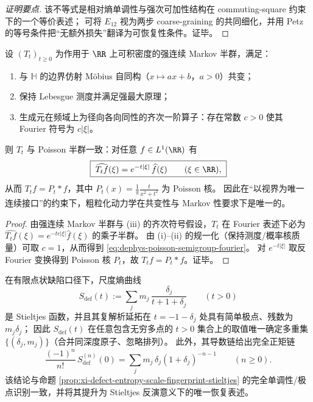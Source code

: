 \begin{proof}[证明要点]
该不等式是相对熵单调性与强次可加性结构在 commuting-square 约束下的一个等价表述；
可将 \(E_{12}\) 视为两步 coarse-graining 的共同细化，并用 Petz 的等号条件把“无额外损失”翻译为可恢复性条件。证毕。
\end{proof}

\begin{theorem}\label{thm:dephys-mobius-markov-unique-poisson}
设 \((T_t)_{t\ge 0}\) 为作用于 \(\RR\) 上可积密度的强连续 Markov 半群，满足：
\begin{enumerate}
  \item[(i)] 与 \(\mathbb{H}\) 的边界仿射 Möbius 自同构（\(x\mapsto ax+b\)，\(a>0\)）共变；
  \item[(ii)] 保持 Lebesgue 测度并满足强最大原理；
  \item[(iii)] 生成元在频域上为径向各向同性的齐次一阶算子：存在常数 \(c>0\) 使其 Fourier 符号为 \(c|\xi|\)。
\end{enumerate}
则 \(T_t\) 与 Poisson 半群一致：对任意 \(f\in L^1(\RR)\) 有
\begin{equation}\label{eq:dephys-poisson-semigroup-fourier}
\boxed{\;
\widehat{T_t f}(\xi)=e^{-t|\xi|}\,\widehat f(\xi)\qquad(\xi\in\RR),\;}
\end{equation}
从而 \(T_t f=P_t*f\)，其中 \(P_t(x)=\frac{1}{\pi}\frac{t}{x^2+t^2}\) 为 Poisson 核。
因此在“以视界为唯一连续接口”的约束下，粗粒化动力学在共变性与 Markov 性要求下是唯一的。
\end{theorem}

\begin{proof}
由强连续 Markov 半群与 (iii) 的齐次符号假设，\(T_t\) 在 Fourier 表述下必为
\(
\widehat{T_t f}(\xi)=e^{-t c|\xi|}\widehat f(\xi)
\) 的乘子半群。
由 (i)–(ii) 的规一化（保持测度/概率核质量）可取 \(c=1\)，从而得到 \eqref{eq:dephys-poisson-semigroup-fourier}。
对 \(e^{-t|\xi|}\) 取反 Fourier 变换得到 Poisson 核 \(P_t\)，故 \(T_t f=P_t*f\)。证毕。
\end{proof}

\begin{corollary}\label{cor:dephys-stieltjes-inversion-scale-entropy}
在有限点状缺陷口径下，尺度熵曲线
\[
S_{\mathrm{def}}(t):=\sum_j m_j\,\frac{\delta_j}{t+1+\delta_j}\qquad(t>0)
\]
是 Stieltjes 函数，并且其复解析延拓在 \(t=-1-\delta_j\) 处具有简单极点、残数为 \(m_j\delta_j\)；
因此 \(S_{\mathrm{def}}(t)\) 在任意包含无穷多点的 \(t>0\) 集合上的取值唯一确定多重集 \(\{(\delta_j,m_j)\}\)（合并同深度原子、忽略排列）。
此外，其导数链给出完全正矩链
\[
\boxed{\;
\frac{(-1)^n}{n!}\,S_{\mathrm{def}}^{(n)}(0)
=\sum_j m_j\,\delta_j(1+\delta_j)^{-n-1}\qquad(n\ge 0).\;}
\]
该结论与命题 \ref{prop:xi-defect-entropy-scale-fingerprint-stieltjes} 的完全单调性/极点识别一致，并将其提升为 Stieltjes 反演意义下的唯一恢复表述。
\end{corollary}

